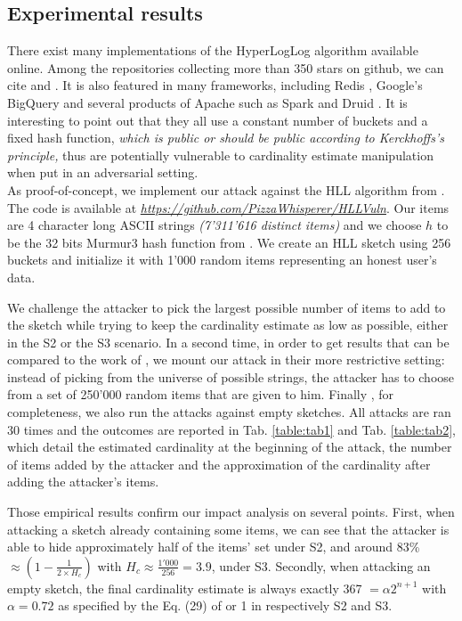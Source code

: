 \documentclass{IEEEtran}
\begin{document}
\subsection{Experimental results}
There exist many implementations of the HyperLogLog algorithm available online. Among the repositories collecting more than 350 stars on github, we can cite \cite{clahll} and \cite{datasketch}. It is also featured in many frameworks, including Redis \cite{redis}, Google's BigQuery \cite{bigquery} and several products of Apache such as Spark \cite{spahll} \cite{spahll2} and Druid \cite{druhll}. It is interesting to point out that they all use a constant number of buckets and a fixed hash function, \textit{which is public or should be public according to Kerckhoffs's principle,} thus are potentially vulnerable to cardinality estimate manipulation when put in an adversarial setting.\\

As proof-of-concept, we implement our attack against the HLL algorithm from \cite{clahll}. The code is available at \href{https://github.com/PizzaWhisperer/HLLVuln}{\textit{\url{https://github.com/PizzaWhisperer/HLLVuln}}}. Our items are 4 character long ASCII strings \textit{(7'311'616 distinct items)} and we choose $h$ to be the 32 bits Murmur3 hash function from \cite{murmur3code}. We create an HLL sketch using 256 buckets and initialize it with 1'000 random items representing an honest user's data.

We challenge the attacker to pick the largest possible number of items to add to the sketch while trying to keep the cardinality estimate as low as possible, either in the S2 or the S3 scenario. In a second time, in order to get results that can be compared to the work of \cite{hllvuln}, we mount our attack in their more restrictive setting: instead of picking from the universe of possible strings, the attacker has to choose from a set of 250'000 random items that are given to him. Finally , for completeness, we also run the attacks against empty sketches. All attacks are ran 30 times and the outcomes are reported in Tab. \ref{table:tab1} and Tab. \ref{table:tab2}, which detail the estimated cardinality at the beginning of the attack, the number of items added by the attacker and the approximation of the cardinality after adding the attacker's items.

Those empirical results confirm our impact analysis on several points. First, when attacking a sketch already containing some items, we can see that the attacker is able to hide approximately half of the items' set under S2, and around 83\%%
$\approx (1-\frac{1}{2\times H_c})$ with $H_c\approx\frac{1'000}{256}=3.9$, under S3.
Secondly, when attacking an empty sketch, the final cardinality estimate is always exactly 367 $=\alpha2^{n+1}$ with $\alpha = 0.72$ as specified by the Eq. (29) of \cite{hll2} or 1 in respectively S2 and S3.
\end{document}
